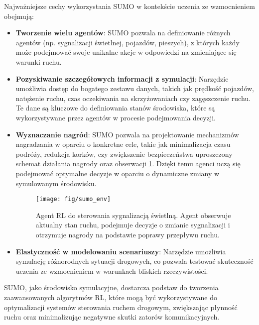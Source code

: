 \documentclass[12pt, a4paper]{article} %
\begin{document}
    Najważniejsze cechy wykorzystania SUMO w kontekście uczenia ze wzmocnieniem obejmują:

    \begin{itemize}
        \item \textbf{Tworzenie wielu agentów}:
        SUMO pozwala na definiowanie różnych agentów (np. sygnalizacji świetlnej, pojazdów, pieszych), z których każdy
        może podejmować swoje unikalne akcje w odpowiedzi na zmieniające się warunki ruchu.
        \item \textbf{Pozyskiwanie szczegółowych informacji z symulacji}:
        Narzędzie umożliwia dostęp do bogatego zestawu danych, takich jak prędkość pojazdów, natężenie ruchu, czas
        oczekiwania na skrzyżowaniach czy zagęszczenie ruchu. Te dane są kluczowe do definiowania stanów środowiska,
        które są wykorzystywane przez agentów w procesie podejmowania decyzji.

        \item \textbf{Wyznaczanie nagród}:
        SUMO pozwala na projektowanie mechanizmów nagradzania w oparciu o konkretne cele, takie jak minimalizacja czasu
        podróży, redukcja korków, czy zwiększenie bezpieczeństwa uproszczony schemat działania nagrody oraz obserwacji \ref{fig:sumo_env}. Dzięki temu agenci uczą się podejmować optymalne
        decyzje w oparciu o dynamiczne zmiany w symulowanym środowisku.
        \begin{figure}[!h]
        \centering
        \texttt{[image: fig/sumo\_env]}
        \caption{Agent RL do sterowania sygnalizacją świetlną. Agent obserwuje aktualny stan ruchu,
            podejmuje decyzje o zmianie sygnalizacji i otrzymuje nagrody na podstawie poprawy przepływu ruchu.}
        \label{fig:sumo_env}
    \end{figure}


        \item \textbf{Elastyczność w modelowaniu scenariuszy}:
        Narzędzie umożliwia symulację różnorodnych sytuacji drogowych, co pozwala testować skuteczność uczenia ze
        wzmocnieniem w warunkach bliskich rzeczywistości.
    \end{itemize}

    SUMO, jako środowisko symulacyjne, dostarcza podstaw do tworzenia zaawansowanych algorytmów RL, które mogą być
    wykorzystywane do optymalizacji systemów sterowania ruchem drogowym, zwiększając płynność ruchu oraz minimalizując
    negatywne skutki zatorów komunikacyjnych.
\end{document}
